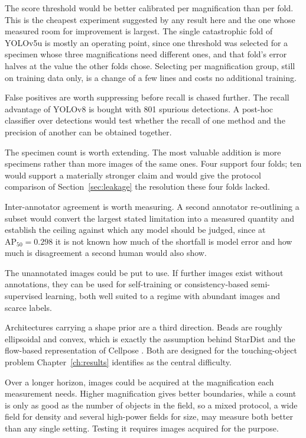 The score threshold would be better calibrated per magnification than per
fold. This is the cheapest experiment suggested by any result here and the one whose measured
room for improvement is largest. The single catastrophic fold of YOLOv5u is mostly an operating
point, since one threshold was selected for a specimen whose three magnifications
need different ones, and that fold's error halves at the value the other folds
chose. Selecting per magnification group, still on training data only, is a change
of a few lines and costs no additional training.

False positives are worth suppressing before recall is chased further. The recall advantage
of YOLOv8 is bought with 801 spurious detections. A post-hoc classifier over
detections would test whether the recall of one method and the precision of
another can be obtained together.

The specimen count is worth extending. The most valuable addition is more specimens
rather than more images of the same ones. Four support four folds; ten would
support a materially stronger claim and would give the protocol comparison of
Section~\ref{sec:leakage} the resolution these four folds lacked.

Inter-annotator agreement is worth measuring. A second annotator re-outlining a
subset would convert the largest stated limitation into a measured quantity and
establish the ceiling against which any model should be judged, since at
$\mathrm{AP}_{50} = 0.298$ it is not known how much of the shortfall is model
error and how much is disagreement a second human would also show.

The unannotated images could be put to use. If further images exist without
annotations, they can be used for self-training or consistency-based
semi-supervised learning, both well suited to a regime with abundant images and
scarce labels.

Architectures carrying a shape prior are a third direction. Beads are
roughly ellipsoidal and convex, which is exactly the assumption behind StarDist \cite{schmidt2018stardist}
and the flow-based representation of Cellpose \cite{stringer2021cellpose}. Both
are designed for the touching-object problem Chapter~\ref{ch:results} identifies
as the central difficulty.

Over a longer horizon, images could be acquired at the magnification each
measurement needs. Higher
magnification
gives better boundaries, while a count is only as good as the number of objects in
the field, so a mixed protocol, a wide field for density and several high-power
fields for size, may measure both better than any single setting. Testing it
requires images acquired for the purpose.

